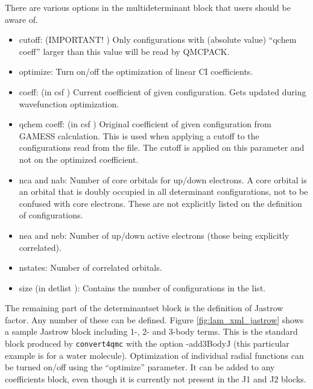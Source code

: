 There are various options in the multideterminant block that users should be aware of.
\begin{itemize}
  \item{cutoff: (IMPORTANT! ) Only configurations with (absolute value) “qchem coeff”
larger than this value will be read by QMCPACK.}
  \item{optimize: Turn on/off the optimization of linear CI coefficients.}
  \item{coeff: (in csf ) Current coefficient of given configuration. Gets updated during 
wavefunction optimization.}
  \item{qchem coeff: (in csf ) Original coefficient of given configuration from GAMESS 
calculation. This is used when applying a cutoff to the configurations read from the file.
The cutoff is applied on this parameter and not on the optimized coefficient.}
  \item{nca and nab: Number of core orbitals for up/down electrons. A core orbital is an
orbital that is doubly occupied in all determinant configurations, not to be confused
with core electrons. These are not explicitly listed on the definition of configurations.}
  \item{nea and neb: Number of up/down active electrons (those being explicitly correlated).}
  \item{nstates: Number of correlated orbitals}.
  \item{size (in detlist ): Contains the number of configurations in the list.}
\end{itemize}
The remaining part of the determinantset block is the definition of Jastrow factor. Any
number of these can be defined. Figure \ref{fig:lam_xml_jastrow} shows a sample Jastrow 
block including 1-, 2- and 3-body terms. This is the standard block produced by 
\texttt{convert4qmc} with the option -add3BodyJ (this particular example is for a water molecule). 
Optimization of individual radial functions can be turned on/off using the “optimize” 
parameter. It can be added to any coefficients block, even though it is currently not 
present in the J1 and J2 blocks.

